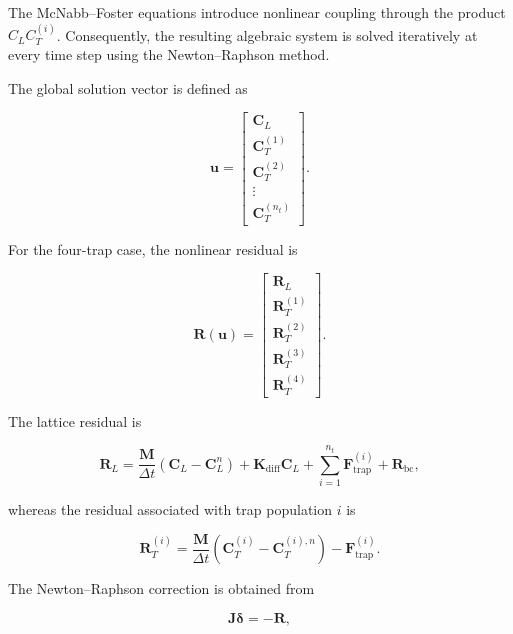 \documentclass[a4paper,12pt,oneside]{report}
\begin{document}
The McNabb--Foster equations introduce nonlinear coupling through
the product $C_LC_T^{(i)}$. Consequently, the resulting algebraic
system is solved iteratively at every time step using the
Newton--Raphson method.

The global solution vector is defined as

\begin{equation}
\mathbf{u}
=
\begin{bmatrix}
\mathbf{C}_L\\
\mathbf{C}_T^{(1)}\\
\mathbf{C}_T^{(2)}\\
\vdots\\
\mathbf{C}_T^{(n_t)}
\end{bmatrix}.
\end{equation}

For the four-trap case, the nonlinear residual is

\begin{equation}
\mathbf{R}(\mathbf{u})
=
\begin{bmatrix}
\mathbf{R}_L\\
\mathbf{R}_T^{(1)}\\
\mathbf{R}_T^{(2)}\\
\mathbf{R}_T^{(3)}\\
\mathbf{R}_T^{(4)}
\end{bmatrix}.
\end{equation}

The lattice residual is

\begin{equation}
\mathbf{R}_L
=
\frac{\mathbf{M}}{\Delta t}
\left(
\mathbf{C}_L-\mathbf{C}_L^{n}
\right)
+
\mathbf{K}_{\mathrm{diff}}\mathbf{C}_L
+
\sum_{i=1}^{n_t}
\mathbf{F}_{\mathrm{trap}}^{(i)}
+
\mathbf{R}_{\mathrm{bc}},
\label{eq:ch3_RL}
\end{equation}

whereas the residual associated with trap population $i$ is

\begin{equation}
\mathbf{R}_T^{(i)}
=
\frac{\mathbf{M}}{\Delta t}
\left(
\mathbf{C}_T^{(i)}
-
\mathbf{C}_T^{(i),n}
\right)
-
\mathbf{F}_{\mathrm{trap}}^{(i)}.
\label{eq:ch3_RT}
\end{equation}

The Newton--Raphson correction is obtained from

\begin{equation}
\mathbf{J}
\boldsymbol{\delta}
=
-\mathbf{R},
\label{eq:ch3_newton}
\end{equation}
\end{document}
